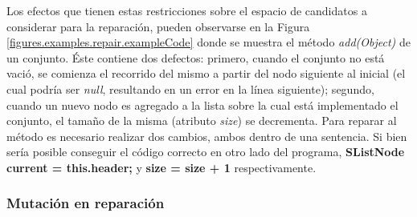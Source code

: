 Los efectos que tienen estas restricciones sobre el espacio de candidatos a considerar para la reparaci\'on, pueden observarse en la Figura \ref{figures.examples.repair.exampleCode} donde se muestra el m\'etodo \emph{add(Object)} de un conjunto. \'Este contiene dos defectos: primero, cuando el conjunto no est\'a vaci\'o, se comienza el recorrido del mismo a partir del nodo siguiente al inicial (el cual podr\'ia ser \emph{null}, resultando en un error en la l\'inea siguiente); segundo, cuando un nuevo nodo es agregado a la lista sobre la cual est\'a implementado el conjunto, el tama\~no de la misma (atributo \emph{size}) se decrementa. Para reparar al m\'etodo es necesario realizar dos cambios, ambos dentro de una sentencia. Si bien ser\'ia posible conseguir el c\'odigo correcto en otro lado del programa, \textbf{SListNode current = this.header;} y \textbf{size = size + 1} respectivamente.


\subsubsection{Mutaci\'on en reparaci\'on}
\label{sec:repair.granularity.mutation}

